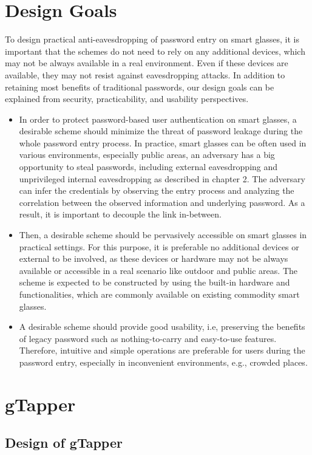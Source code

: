 \documentclass[12pt,a4paper,oneside]{report}
\begin{document}
\section{Design Goals}

To design practical anti-eavesdropping of password entry
on smart glasses, it is important that the schemes do not need
to rely on any additional devices, which may not be always
available in a real environment. Even if these devices are
available, they may not resist against eavesdropping attacks.
In addition to retaining most benefits of traditional passwords,
our design goals can be explained from security, practicability,
and usability perspectives.
\begin{itemize}
    \item In order to protect password-based user authentication on
smart glasses, a desirable scheme should minimize the
threat of password leakage during the whole password
entry process. In practice, smart glasses can be often
used in various environments, especially public areas,
an adversary has a big opportunity to steal passwords,
including external eavesdropping and unprivileged internal eavesdropping as described in chapter 2. The
adversary can infer the credentials by observing the
entry process and analyzing the correlation between the
observed information and underlying password. As a
result, it is important to decouple the link in-between.
\item Then, a desirable scheme should be pervasively accessible
on smart glasses in practical settings. For this purpose,
it is preferable no additional devices or external to be
involved, as these devices or hardware may not be always
available or accessible in a real scenario like outdoor and
public areas. The scheme is expected to be constructed
by using the built-in hardware and functionalities, which
are commonly available on existing commodity smart
glasses.
\item A desirable scheme should provide good usability, i.e,
preserving the benefits of legacy password such as
nothing-to-carry and easy-to-use features. Therefore,
intuitive and simple operations are preferable for users
during the password entry, especially in inconvenient
environments, e.g., crowded places.
\end{itemize}


\section{gTapper}
\subsection{Design of gTapper}
\end{document}
